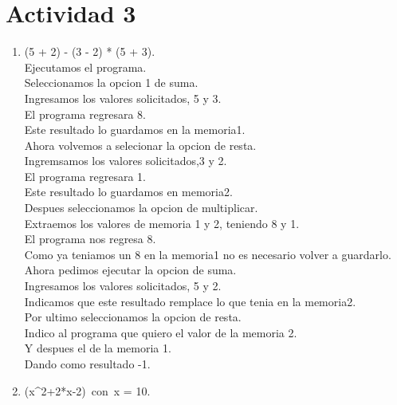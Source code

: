 \documentclass[a4paper,12pt]{article}
\begin{document}
\section{Actividad 3}
\begin{enumerate}
\item (5 + 2) - (3 - 2) * (5 + 3).\\ 
Ejecutamos el programa.\\
Seleccionamos la opcion 1 de suma.\\
Ingresamos los valores solicitados, 5 y 3.\\
El programa regresara 8.\\
Este resultado lo guardamos en la memoria1.\\
Ahora volvemos a selecionar la opcion de resta.\\
Ingremsamos los valores solicitados,3 y 2.\\
El programa regresara 1.\\
Este resultado lo guardamos en memoria2.\\
Despues seleccionamos la opcion de multiplicar.\\
Extraemos los valores de memoria 1 y 2, teniendo 8 y 1.\\
El programa nos regresa 8.\\
Como ya teniamos un 8 en la memoria1 no es necesario volver a guardarlo.\\
Ahora pedimos ejecutar la opcion de suma.\\
Ingresamos los valores solicitados, 5 y 2.\\
Indicamos que este resultado remplace lo que tenia en la memoria2.\\
Por ultimo seleccionamos la opcion de resta.\\
Indico al programa que quiero el valor de la memoria 2.\\
Y despues el de la memoria 1.\\
Dando como resultado -1.\\

\item(x^2+2*x-2)~con~x = 10.
  

\end{enumerate}
\end{document}
